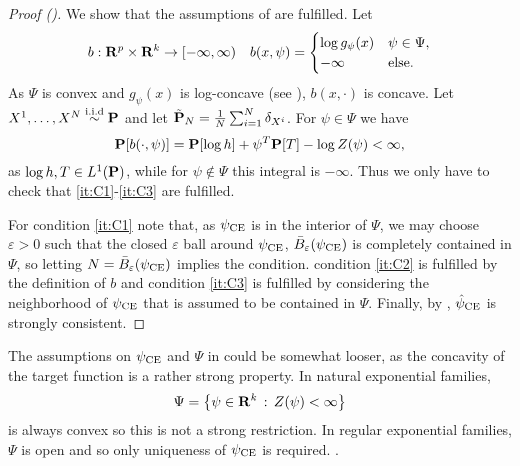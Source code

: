 \begin{proof}[Proof ()]
    We show that the assumptions of  are fulfilled. Let
    \begin{align*}
        b: \R^{p}\times \R^{k} \to [-\infty, \infty) && b(x, \psi) = \begin{cases}
            \log g_{\psi}(x) & \psi \in \Psi, \\
            - \infty & \text{else.}
        \end{cases} 
    \end{align*}
    As $\Psi$ is convex and $g_{\psi}(x)$ is log-concave (see ), $b(x, \cdot)$ is concave. Let $X^{1}, \dots, X^{N} \iid \P$ and let $\tilde{\P}_{N} = \frac{1}{N} \sum_{i = 1}^N \delta_{X^{i}}$. For $\psi \in \Psi$ we have
    $$
    \P [b(\cdot, \psi)] = \P [\log h] + \psi^{T}\P[T] - \log Z(\psi) < \infty,
    $$
    as $\log h, T \in L^{1}(\P)$, while for $\psi \notin \Psi$ this integral is $-\infty$. Thus we only have to check that \ref{it:C1}-\ref{it:C3} are fulfilled. 
    
    For condition \ref{it:C1} note that, as $\pce$ is in the interior of $\Psi$, we may choose $\varepsilon > 0$ such that the closed $\varepsilon$ ball around $\pce$, $\bar B_{\varepsilon} (\pce)$ is completely contained in $\Psi$, so letting $N = \bar B_{\varepsilon} (\pce)$ implies the condition. condition \ref{it:C2} is fulfilled by the definition of $b$ and condition \ref{it:C3} is fulfilled by considering the neighborhood of $\pce$ that is assumed to be contained in $\Psi$. Finally, by , $\hpce$ is strongly consistent.
\end{proof}

The assumptions on $\pce$ and $\Psi$ in  could be somewhat looser, as the concavity of the target function is a rather strong property. In natural exponential families, 
$$
\Psi = \left\{ \psi \in \R^{k} \,:\, Z(\psi) < \infty \right\}
$$
is always convex so this is not a strong restriction. In regular exponential families, $\Psi$ is open and so only uniqueness of $\pce$ is required. . 

